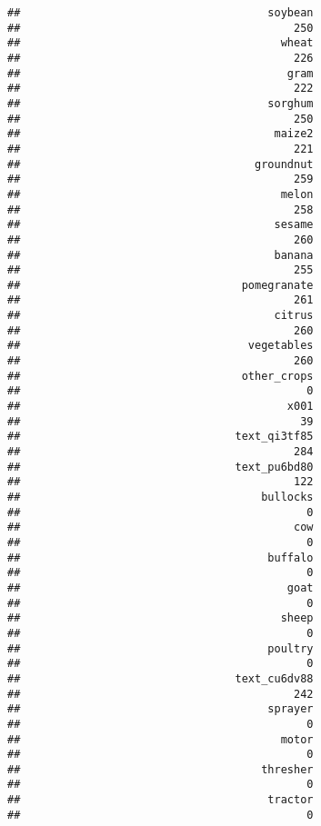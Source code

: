 \documentclass[
]{article}
\begin{document}
\begin{verbatim}
##                                      soybean 
##                                          250 
##                                        wheat 
##                                          226 
##                                         gram 
##                                          222 
##                                      sorghum 
##                                          250 
##                                       maize2 
##                                          221 
##                                    groundnut 
##                                          259 
##                                        melon 
##                                          258 
##                                       sesame 
##                                          260 
##                                       banana 
##                                          255 
##                                  pomegranate 
##                                          261 
##                                       citrus 
##                                          260 
##                                   vegetables 
##                                          260 
##                                  other_crops 
##                                            0 
##                                         x001 
##                                           39 
##                                 text_qi3tf85 
##                                          284 
##                                 text_pu6bd80 
##                                          122 
##                                     bullocks 
##                                            0 
##                                          cow 
##                                            0 
##                                      buffalo 
##                                            0 
##                                         goat 
##                                            0 
##                                        sheep 
##                                            0 
##                                      poultry 
##                                            0 
##                                 text_cu6dv88 
##                                          242 
##                                      sprayer 
##                                            0 
##                                        motor 
##                                            0 
##                                     thresher 
##                                            0 
##                                      tractor 
##                                            0 

\end{verbatim}
\end{document}
